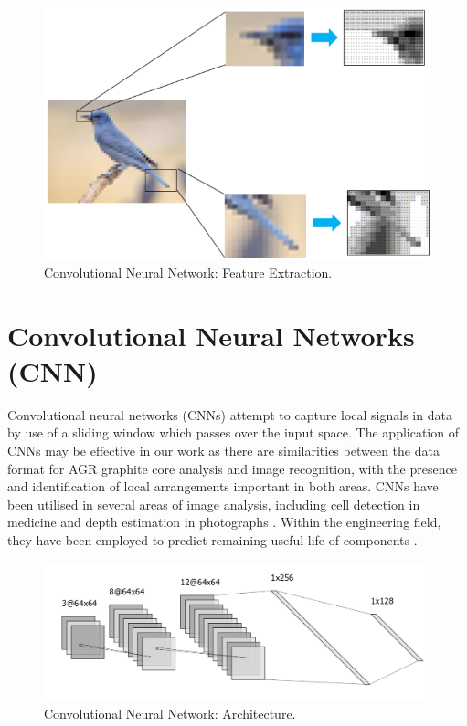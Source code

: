 \begin{figure}[p]
	\centering
	\includegraphics[scale=0.75]{Figures/cnn_feature.png}
	\caption{Convolutional Neural Network: Feature Extraction.}
	\label{fig:cnn_feature}
\end{figure}

\section{Convolutional Neural Networks (CNN)} \label{convolution}

Convolutional neural networks (CNNs) attempt to capture local signals in data by use of a sliding window which passes over the input space. The application of CNNs may be effective in our work as there are similarities between the data format for AGR graphite core analysis and image recognition, with the presence and identification of local arrangements important in both areas. CNNs have been utilised in several areas of image analysis, including cell detection in medicine \cite{xie2015beyond} and depth estimation in photographs \cite{li2015depth}. Within the engineering field, they have been employed to predict remaining useful life of components \cite{babu2016deep}.
\\

\begin{figure}[p]
	\centering
	\includegraphics[scale=0.45]{Figures/cnn_arch.png}
	\caption{Convolutional Neural Network: Architecture.}
	\label{fig:cnn}
\end{figure}

